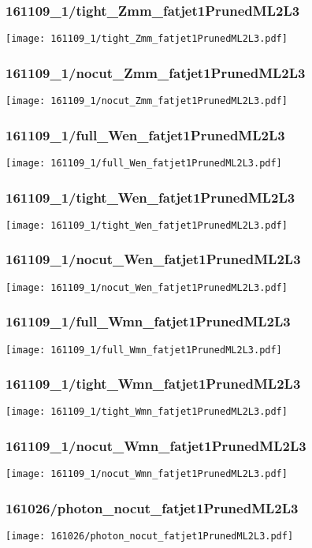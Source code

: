\begin{frame}
   \frametitle{\small 161109\_1/tight\_Zmm\_fatjet1PrunedML2L3}
   \centering
   \texttt{[image: 161109\_1/tight\_Zmm\_fatjet1PrunedML2L3.pdf]}
\end{frame}

\begin{frame}
   \frametitle{\small 161109\_1/nocut\_Zmm\_fatjet1PrunedML2L3}
   \centering
   \texttt{[image: 161109\_1/nocut\_Zmm\_fatjet1PrunedML2L3.pdf]}
\end{frame}

\begin{frame}
   \frametitle{\small 161109\_1/full\_Wen\_fatjet1PrunedML2L3}
   \centering
   \texttt{[image: 161109\_1/full\_Wen\_fatjet1PrunedML2L3.pdf]}
\end{frame}

\begin{frame}
   \frametitle{\small 161109\_1/tight\_Wen\_fatjet1PrunedML2L3}
   \centering
   \texttt{[image: 161109\_1/tight\_Wen\_fatjet1PrunedML2L3.pdf]}
\end{frame}

\begin{frame}
   \frametitle{\small 161109\_1/nocut\_Wen\_fatjet1PrunedML2L3}
   \centering
   \texttt{[image: 161109\_1/nocut\_Wen\_fatjet1PrunedML2L3.pdf]}
\end{frame}

\begin{frame}
   \frametitle{\small 161109\_1/full\_Wmn\_fatjet1PrunedML2L3}
   \centering
   \texttt{[image: 161109\_1/full\_Wmn\_fatjet1PrunedML2L3.pdf]}
\end{frame}

\begin{frame}
   \frametitle{\small 161109\_1/tight\_Wmn\_fatjet1PrunedML2L3}
   \centering
   \texttt{[image: 161109\_1/tight\_Wmn\_fatjet1PrunedML2L3.pdf]}
\end{frame}

\begin{frame}
   \frametitle{\small 161109\_1/nocut\_Wmn\_fatjet1PrunedML2L3}
   \centering
   \texttt{[image: 161109\_1/nocut\_Wmn\_fatjet1PrunedML2L3.pdf]}
\end{frame}

\begin{frame}
   \frametitle{\small 161026/photon\_nocut\_fatjet1PrunedML2L3}
   \centering
   \texttt{[image: 161026/photon\_nocut\_fatjet1PrunedML2L3.pdf]}
\end{frame}

